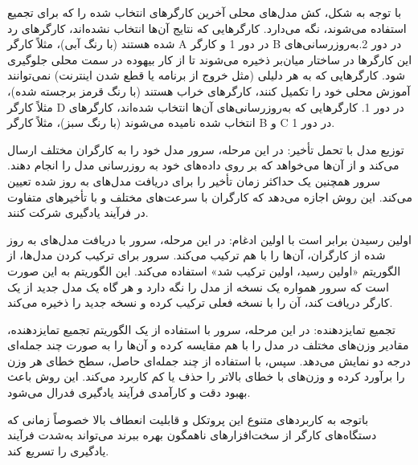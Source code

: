 با توجه به شکل، کش مدل‌های محلی آخرین کارگر‌های انتخاب شده را که برای تجمیع استفاده می‌شوند، نگه می‌دارد. کارگر‌هایی که نتایج آن‌ها انتخاب نشده‌اند، کارگر‌های رد شده هستند (با رنگ آبی)، مثلاً کارگر A در دور 1 و کارگر B در دور 2.به‌روزرسانی‌های این کارگر‌ها در ساختار میان‌بر ذخیره می‌شوند تا از کار بیهوده در سمت محلی جلوگیری شود. کارگر‌هایی که به هر دلیلی (مثل خروج از برنامه یا قطع شدن اینترنت) نمی‌توانند آموزش محلی خود را تکمیل کنند، کارگر‌های خراب هستند (با رنگ قرمز برجسته شده)، مثلاً کارگر D در دور 1. کارگر‌هایی که به‌روزرسانی‌های آن‌ها انتخاب شده‌اند، کارگر‌های انتخاب شده نامیده می‌شوند (با رنگ سبز)، مثلاً کارگر B و C در دور 1.


توزیع مدل با تحمل تأخیر: در این مرحله، سرور مدل خود را به کارگران مختلف ارسال می‌کند و از آن‌ها می‌خواهد که بر روی داده‌های خود به روزرسانی مدل را انجام دهند. سرور همچنین یک حداکثر زمان تأخیر را برای دریافت مدل‌های به روز شده تعیین می‌کند. این روش اجازه می‌دهد که کارگران با سرعت‌های مختلف و با تأخیرهای متفاوت در فرآیند یادگیری شرکت کنند.

اولین رسیدن برابر است با اولین ادغام: در این مرحله، سرور با دریافت مدل‌های به روز شده از کارگران، آن‌ها را با هم ترکیب می‌کند. سرور برای ترکیب کردن مدل‌ها، از الگوریتم «اولین رسید، اولین ترکیب شد» استفاده می‌کند. این الگوریتم به این صورت است که سرور همواره یک نسخه از مدل را نگه دارد و هر گاه یک مدل جدید از یک کارگر دریافت کند، آن را با نسخه فعلی ترکیب کرده و نسخه جدید را ذخیره می‌کند.

تجمیع تمایزدهنده: در این مرحله، سرور با استفاده از یک الگوریتم تجمیع تمایزدهنده، مقادیر وزن‌های مختلف در مدل را با هم مقایسه کرده و آن‌ها را به صورت چند جمله‌ای درجه دو نمایش می‌دهد. سپس، با استفاده از چند جمله‌ای حاصل، سطح خطای هر وزن را برآورد کرده و وزن‌های با خطای بالاتر را حذف یا کم کاربرد می‌کند. این روش باعث بهبود دقت و کارآمدی فرآیند یادگیری فدرال می‌شود.

باتوجه به کاربرد‌های متنوع این پروتکل و قابلیت انعطاف بالا خصوصاً زمانی که دستگاه‌های کارگر از سخت‌افزارهای ناهمگون بهره ببرند می‌تواند به‌شدت فرآیند یادگیری را تسریع کند.

